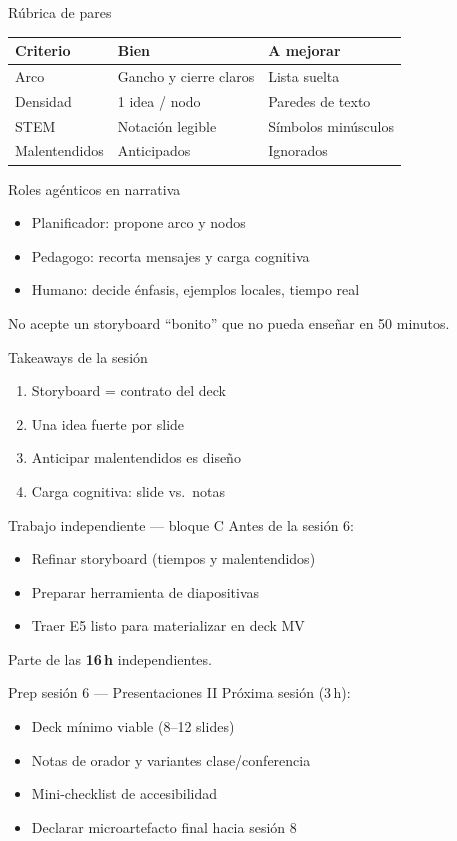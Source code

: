 \documentclass[aspectratio=169,11pt]{beamer}
\begin{document}
\begin{frame}{Rúbrica de pares}
\begin{tabularx}{\textwidth}{@{}lXX@{}}
\toprule
Criterio & Bien & A mejorar \\
\midrule
Arco & Gancho y cierre claros & Lista suelta \\
Densidad & 1 idea / nodo & Paredes de texto \\
STEM & Notación legible & Símbolos minúsculos \\
Malentendidos & Anticipados & Ignorados \\
\bottomrule
\end{tabularx}
\end{frame}

\begin{frame}{Roles agénticos en narrativa}
\begin{itemize}
\item Planificador: propone arco y nodos
\item Pedagogo: recorta mensajes y carga cognitiva
\item Humano: decide énfasis, ejemplos locales, tiempo real
\end{itemize}
No acepte un storyboard ``bonito'' que no pueda enseñar en 50 minutos.
\end{frame}

\begin{frame}{Takeaways de la sesión}
\begin{enumerate}
\item Storyboard = contrato del deck
\item Una idea fuerte por slide
\item Anticipar malentendidos es diseño
\item Carga cognitiva: slide vs.\ notas
\end{enumerate}
\end{frame}

\begin{frame}{Trabajo independiente --- bloque C}
Antes de la sesión 6:
\begin{itemize}
\item Refinar storyboard (tiempos y malentendidos)
\item Preparar herramienta de diapositivas
\item Traer E5 listo para materializar en deck MV
\end{itemize}
Parte de las \textbf{16\,h} independientes.
\end{frame}

\begin{frame}{Prep sesión 6 --- Presentaciones II}
Próxima sesión (3\,h):
\begin{itemize}
\item Deck mínimo viable (8--12 slides)
\item Notas de orador y variantes clase/conferencia
\item Mini-checklist de accesibilidad
\item Declarar microartefacto final hacia sesión 8
\end{itemize}
\end{frame}
\end{document}
